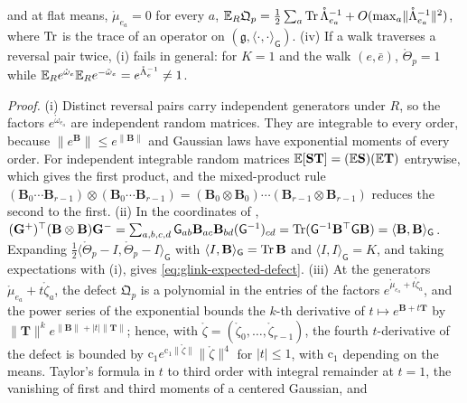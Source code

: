 and at flat means, \(\mathring\mu_{e_a}=0\) for every \(a\),
\(\mathbb E_R\mathfrak Q_p=\tfrac12\sum_a\operatorname{Tr}\mathring\Lambda_{e_a}^{-1}+O(\max_a\lVert\mathring\Lambda_{e_a}^{-1}\rVert^2)\),
where \(\operatorname{Tr}\) is the trace of an operator on \((\mathfrak g,\langle\cdot,\cdot\rangle_{\mathsf G})\).
(iv) If a walk traverses a reversal pair twice, (i) fails in general: for \(K=1\) and the walk
\((e,\bar e)\), \(\mathring\Theta_p=1\) while
\(\mathbb E_Re^{\mathring\omega_e}\mathbb E_Re^{-\mathring\omega_e}=e^{\mathring\Lambda_e^{-1}}\neq1\).

\noindent\emph{Proof.}
(i) Distinct reversal pairs carry independent generators under \(R\), so the factors
\(e^{\mathring\omega_{e_a}}\) are independent random matrices. They are integrable to every order,
because \(\lVert e^{\mathbf B}\rVert\leq e^{\lVert\mathbf B\rVert}\) and Gaussian laws have exponential moments of
every order. For independent integrable random matrices \(\mathbb E[\mathbf S\mathbf T]=(\mathbb E\mathbf S)(\mathbb E\mathbf T)\)
entrywise, which gives the first product, and the mixed-product rule
\((\mathbf B_0\cdots\mathbf B_{r-1})\otimes(\mathbf B_0\cdots\mathbf B_{r-1})=(\mathbf B_0\otimes\mathbf B_0)\cdots(\mathbf B_{r-1}\otimes\mathbf B_{r-1})\)
reduces the second to the first. (ii) In the coordinates of ,
\((\mathbf G^+)^\top(\mathbf B\otimes\mathbf B)\mathbf G^-=\sum_{a,b,c,d}\mathsf G_{ab}\mathbf B_{ac}\mathbf B_{bd}(\mathsf G^{-1})_{cd}
=\operatorname{Tr}(\mathsf G^{-1}\mathbf B^\top\mathsf G\mathbf B)=\langle\mathbf B,\mathbf B\rangle_{\mathsf G}\). Expanding
\(\tfrac12\langle\mathring\Theta_p-I,\mathring\Theta_p-I\rangle_{\mathsf G}\) with
\(\langle I,\mathbf B\rangle_{\mathsf G}=\operatorname{Tr}\mathbf B\) and \(\langle I,I\rangle_{\mathsf G}=K\), and taking
expectations with (i), gives \eqref{eq:glink-expected-defect}.
(iii) At the generators \(\mathring\mu_{e_a}+t\mathring\zeta_a\), the defect \(\mathfrak Q_p\) is a polynomial in
the entries of the factors \(e^{\mathring\mu_{e_a}+t\mathring\zeta_a}\), and the power series of the
exponential bounds the \(k\)-th derivative of \(t\mapsto e^{\mathbf B+t\mathbf T}\) by
\(\lVert\mathbf T\rVert^ke^{\lVert\mathbf B\rVert+\lvert t\rvert\lVert\mathbf T\rVert}\); hence, with
\(\mathring\zeta=(\mathring\zeta_0,\ldots,\mathring\zeta_{r-1})\), the fourth \(t\)-derivative of the defect is
bounded by \(\mathrm c_1e^{\mathrm c_1\lVert\mathring\zeta\rVert}\lVert\mathring\zeta\rVert^4\) for
\(\lvert t\rvert\leq1\), with \(\mathrm c_1\) depending on the means. Taylor's formula in \(t\) to third order
with integral remainder at \(t=1\), the vanishing of first and third moments of a centered Gaussian, and
